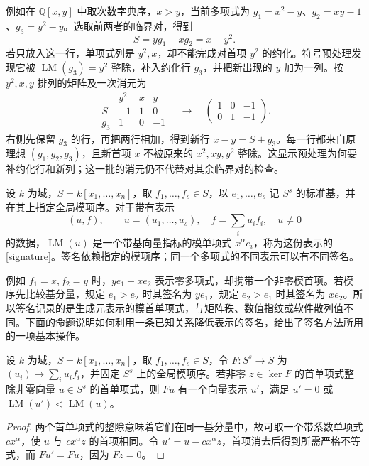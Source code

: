 \ProseParagraphBreak
例如在 \(\mathbb Q[x,y]\) 中取次数字典序，\(x>y\)，当前多项式为 \(g_1=x^2-y\)、\(g_2=xy-1\)、\(g_3=y^2-y\)。选取前两者的临界对，得到
\[
	S=yg_1-xg_2=x-y^2.
\]
若只放入这一行，单项式列是 \(y^2,x\)，却不能完成对首项 \(y^2\) 的约化。符号预处理发现它被 \(\operatorname{LM}(g_3)=y^2\) 整除，补入约化行 \(g_3\)，并把新出现的 \(y\) 加为一列。按 \(y^2,x,y\) 排列的矩阵及一次消元为
\[
	\begin{array}{c|rrr}
		&y^2&x&y\\\hline S&-1&1&0\\
		g_3&1&0&-1
	\end{array}
	\quad\longrightarrow\quad
	\begin{pmatrix}1&0&-1\\0&1&-1\end{pmatrix}.
\]
右侧先保留 \(g_3\) 的行，再把两行相加，得到新行 \(x-y=S+g_3\)。每一行都来自原理想 \((g_1,g_2,g_3)\)，且新首项 \(x\) 不被原来的 \(x^2,xy,y^2\) 整除。这显示预处理为何要补约化行和新列；这一批的消元仍不代替对其余临界对的检查。

\begin{definition}\label{b3:def:B-signature}
	设 \(k\) 为域，\(S=k[x_1,\ldots,x_n]\)，取 \(f_1,\ldots,f_s\in S\)，以 \(e_1,\ldots,e_s\) 记 \(S^s\) 的标准基，并在其上指定全局模项序。对于带有表示
	\[
		(u,f),\qquad u=(u_1,\ldots,u_s),\quad f=\sum_i u_if_i,\quad u\ne0
	\]
	的数据，\(\operatorname{LM}(u)\) 是一个带基向量指标的模单项式 \(x^\alpha e_i\)，称为这份表示的[signature]。签名依赖指定的模项序；同一个多项式的不同表示可以有不同签名。
\end{definition}

例如 \(f_1=x,f_2=y\) 时，\(y e_1-x e_2\) 表示零多项式，却携带一个非零模首项。若模序先比较基分量，规定 \(e_1>e_2\) 时其签名为 \(y e_1\)，规定 \(e_2>e_1\) 时其签名为 \(x e_2\)。所以签名记录的是生成元表示的模首单项式，与矩阵秩、数值指纹或软件散列值不同。下面的命题说明如何利用一条已知关系降低表示的签名，给出了签名方法所用的一项基本操作。

\begin{proposition}\label{b3:prop:B-signature-rewrite}
	设 \(k\) 为域，\(S=k[x_1,\ldots,x_n]\)，取 \(f_1,\ldots,f_s\in S\)，令 \(F:S^s\to S\) 为 \((u_i)\mapsto\sum_i u_if_i\)，并固定 \(S^s\) 上的全局模项序。若非零 \(z\in\ker F\) 的首单项式整除非零向量 \(u\in S^s\) 的首单项式，则 \(Fu\) 有一个向量表示 \(u'\)，满足 \(u'=0\) 或 \(\operatorname{LM}(u')<\operatorname{LM}(u)\)。
\end{proposition}
\begin{proof}
	两个首单项式的整除意味着它们在同一基分量中，故可取一个带系数单项式 \(c x^\alpha\)，使 \(u\) 与 \(c x^\alpha z\) 的首项相同。令 \(u'=u-cx^\alpha z\)，首项消去后得到所需严格不等式，而 \(Fu'=Fu\)，因为 \(Fz=0\)。
\end{proof}

